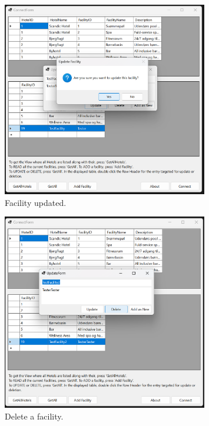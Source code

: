 \begin{figure}
    \centering
    \includegraphics[width=0.8\textwidth]{figures/app-screenshots/9updateprompt.png}
    \caption{Facility updated.}
    \label{fig:9updateprompt}
\end{figure}

\begin{figure}
    \centering
    \includegraphics[width=0.8\textwidth]{figures/app-screenshots/10deleteform.png}
    \caption{Delete a facility.}
    \label{fig:10deleteform}
\end{figure}

